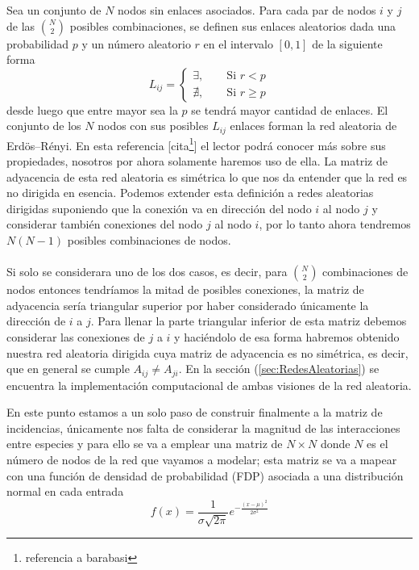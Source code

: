 \begin{definición}\label{def:redAleatoria}
	Sea un conjunto de $N$ nodos sin enlaces asociados. Para cada par de nodos $i$ y $j$ de las $\binom{N}{2}$ posibles combinaciones, se definen sus enlaces aleatorios dada una probabilidad $p$ y un número aleatorio $r$ en el intervalo $[0,1]$ de la siguiente forma
	$$
	L_{ij}=\begin{cases}
		\exists,\qquad\text{Si }r<p\\
		\nexists,\qquad\text{Si }r\geq p
	\end{cases}
	$$
	desde luego que entre mayor sea la $p$ se tendrá mayor cantidad de enlaces. El conjunto de los $N$ nodos con sus posibles $L_{ij}$ enlaces forman la red aleatoria de Erdös–Rényi. En esta referencia [cita\footnote{referencia a barabasi}] el lector podrá conocer más sobre sus propiedades, nosotros por ahora solamente haremos uso de ella. La matriz de adyacencia de esta red aleatoria es simétrica lo que nos da entender que la red es no dirigida en esencia. Podemos extender esta definición a redes aleatorias dirigidas suponiendo que la conexión va en dirección del nodo $i$ al nodo $j$ y considerar también conexiones del nodo $j$ al nodo $i$, por lo tanto ahora tendremos $N(N-1)$ posibles combinaciones de nodos. \\
	\\
	Si solo se considerara uno de los dos casos, es decir, para $\binom{N}{2}$ combinaciones de nodos entonces tendríamos la mitad de posibles conexiones, la matriz de adyacencia sería triangular superior por haber considerado únicamente la dirección de $i$ a $j$. Para llenar la parte triangular inferior de esta matriz debemos considerar las conexiones de $j$ a $i$ y haciéndolo de esa forma habremos obtenido nuestra red aleatoria dirigida cuya matriz de adyacencia es no simétrica, es decir, que en general se cumple $A_{ij}\neq A_{ji}$. En la sección (\ref{sec:RedesAleatorias}) se encuentra la implementación computacional de ambas visiones de la red aleatoria.
\end{definición}
\newpage
\setlength{\parindent}{0cm}En este punto estamos a un solo paso de construir finalmente a la matriz de incidencias, únicamente nos falta de considerar la magnitud de las interacciones entre especies y para ello se va a emplear una matriz de $N\times N$ donde $N$ es el número de nodos de la red que vayamos a modelar; esta matriz se va a mapear con una función de densidad de probabilidad (FDP) asociada a una distribución normal en cada entrada
$$f(x)=\frac{1}{\sigma\sqrt{2\pi}}e^{-\frac{(x-\mu)^2}{2\sigma^2}}$$

